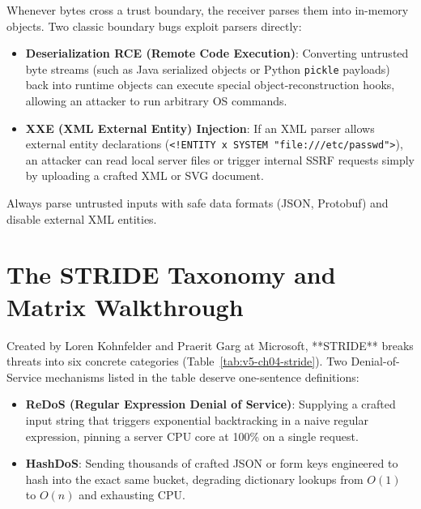 \begin{underthehoodbox}
Whenever bytes cross a trust boundary, the receiver parses them into in-memory objects. Two classic boundary bugs exploit parsers directly:
\begin{itemize}[leftmargin=14pt]
  \item \textbf{Deserialization RCE (Remote Code Execution)}: Converting untrusted byte streams (such as Java serialized objects or Python \texttt{pickle} payloads) back into runtime objects can execute special object-reconstruction hooks, allowing an attacker to run arbitrary OS commands.
  \item \textbf{XXE (XML External Entity) Injection}: If an XML parser allows external entity declarations (\texttt{<!ENTITY x SYSTEM "file:///etc/passwd">}), an attacker can read local server files or trigger internal SSRF requests simply by uploading a crafted XML or SVG document.
\end{itemize}
Always parse untrusted inputs with safe data formats (JSON, Protobuf) and disable external XML entities.
\end{underthehoodbox}

\section{The STRIDE Taxonomy and Matrix Walkthrough}

Created by Loren Kohnfelder and Praerit Garg at Microsoft, **STRIDE** breaks threats into six concrete categories (Table~\ref{tab:v5-ch04-stride}). Two Denial-of-Service mechanisms listed in the table deserve one-sentence definitions:
\begin{itemize}[leftmargin=18pt]
  \item \textbf{ReDoS (Regular Expression Denial of Service)}: Supplying a crafted input string that triggers exponential backtracking in a naive regular expression, pinning a server CPU core at 100\% on a single request.
  \item \textbf{HashDoS}: Sending thousands of crafted JSON or form keys engineered to hash into the exact same bucket, degrading dictionary lookups from $O(1)$ to $O(n)$ and exhausting CPU.
\end{itemize}


